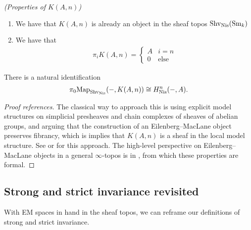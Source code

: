 \documentclass[11pt,openany]{book}
\begin{document}
\begin{proposition} \textit{(Properties of $K(A,n)$)}
\begin{enumerate}
    \item We have that $K(A,n)$ is already an object in the sheaf topos $\mathrm{Shv}_{\mathrm{Nis}}(\mathrm{Sm}_k)$
    \item We have that
    \begin{align*}
        \pi_i K(A,n) = \begin{cases} A & i=n \\ 0 & \text{else} \end{cases}
    \end{align*}
\end{enumerate}
\item There is a natural identification
\begin{align*}
    \pi_0 \mathrm{Map}_{\mathrm{Shv}_{\mathrm{Nis}}}(-,K(A,n)) \cong H^n_{\mathrm{Nis}}(-,A).
\end{align*}
\end{proposition}
\begin{proof}[Proof references] The classical way to approach this is using explicit model structures on simplicial presheaves and chain complexes of sheaves of abelian groups, and arguing that the construction of an Eilenberg--MacLane object preserves fibrancy, which is implies that $K(A,n)$ is a sheaf in the local model structure.  See \cite[Chapter~6]{Morel} or \cite[pp.56---59]{MV} for this approach. The high-level perspective on Eilenberg--MacLane objects in a general $\infty$-topos is in \cite[\S7.2.2]{HTT}, from which these properties are formal.
\end{proof}



\subsection{Strong and strict invariance revisited}

With EM spaces in hand in the sheaf topos, we can reframe our definitions of strong and strict invariance.
\end{document}
